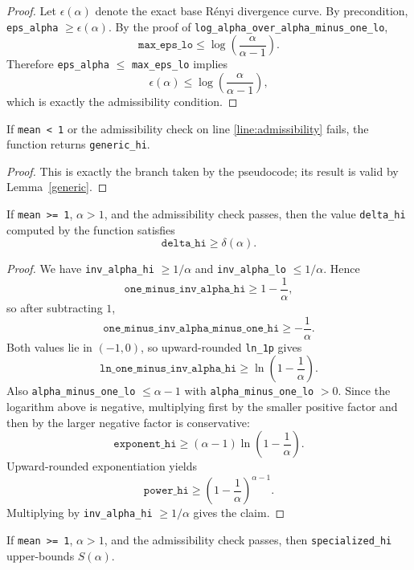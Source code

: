 \documentclass{article}
\begin{document}
\begin{proof}
Let $\epsilon(\alpha)$ denote the exact base Rényi divergence curve.
By precondition, \texttt{eps\_alpha} $\ge \epsilon(\alpha)$.
By the proof of \texttt{log\_alpha\_over\_alpha\_minus\_one\_lo},
\[
\texttt{max\_eps\_lo} \le \log\!\left(\frac{\alpha}{\alpha - 1}\right).
\]
Therefore \texttt{eps\_alpha} $\le$ \texttt{max\_eps\_lo} implies
\[
\epsilon(\alpha) \le \log\!\left(\frac{\alpha}{\alpha - 1}\right),
\]
which is exactly the admissibility condition.
\end{proof}

\begin{lemma}
\label{fallback}
If \texttt{mean < 1} or the admissibility check on line
\ref{line:admissibility} fails, the function returns \texttt{generic\_hi}.
\end{lemma}

\begin{proof}
This is exactly the branch taken by the pseudocode; its result is valid by
Lemma~\ref{generic}.
\end{proof}

\begin{lemma}
\label{delta}
If \texttt{mean >= 1}, $\alpha > 1$, and the admissibility check passes, then the value
\texttt{delta\_hi} computed by the function satisfies
\[
\texttt{delta\_hi} \ge \delta(\alpha).
\]
\end{lemma}

\begin{proof}
We have \texttt{inv\_alpha\_hi} $\ge 1/\alpha$ and \texttt{inv\_alpha\_lo} $\le 1/\alpha$.
Hence
\[
\texttt{one\_minus\_inv\_alpha\_hi} \ge 1 - \frac{1}{\alpha},
\]
so after subtracting $1$,
\[
\texttt{one\_minus\_inv\_alpha\_minus\_one\_hi} \ge -\frac{1}{\alpha}.
\]
Both values lie in $(-1,0)$, so upward-rounded \texttt{ln\_1p} gives
\[
\texttt{ln\_one\_minus\_inv\_alpha\_hi}
\ge
\ln\!\left(1 - \frac{1}{\alpha}\right).
\]
Also \texttt{alpha\_minus\_one\_lo} $\le \alpha - 1$ with \texttt{alpha\_minus\_one\_lo} $> 0$.
Since the logarithm above is negative, multiplying first by the smaller positive factor and then
by the larger negative factor is conservative:
\[
\texttt{exponent\_hi}
\ge
(\alpha - 1)\ln\!\left(1 - \frac{1}{\alpha}\right).
\]
Upward-rounded exponentiation yields
\[
\texttt{power\_hi}
\ge
\left(1 - \frac{1}{\alpha}\right)^{\alpha - 1}.
\]
Multiplying by \texttt{inv\_alpha\_hi} $\ge 1/\alpha$ gives the claim.
\end{proof}

\begin{lemma}
\label{main}
If \texttt{mean >= 1}, $\alpha > 1$, and the admissibility check passes,
then \texttt{specialized\_hi} upper-bounds $S(\alpha)$.
\end{lemma}
\end{document}
